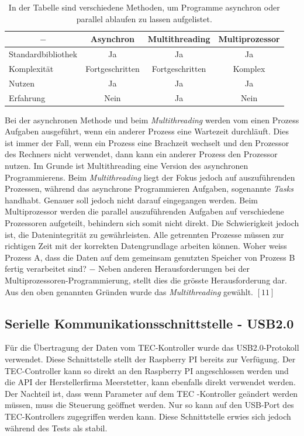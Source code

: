 \begin{table}[H]
    \centering
    \begin{tabular}{l|c|c|c}
         \multicolumn{1}{c|}{$-$}&   \textbf{Asynchron}& \textbf{Multithreading}& \textbf{Multiprozessor}\\
         \hline
         Standardbibliothek&        Ja&                 Ja&                 Ja\\
         Komplexität&               Fortgeschritten&    Fortgeschritten&    Komplex\\
         Nutzen&                    Ja&                 Ja&                 Ja\\
         Erfahrung&                 Nein&               Ja&                 Nein
    \end{tabular}
    \caption{In der Tabelle sind verschiedene Methoden, um Programme asynchron oder parallel ablaufen zu lassen aufgelistet.}
    \label{tab:async_threading_multiprocessor}
\end{table}

Bei der asynchronen Methode und beim \textit{Multithreading} werden vom einen Prozess Aufgaben ausgeführt, wenn ein anderer Prozess eine Wartezeit durchläuft. Dies ist immer der Fall, wenn ein Prozess eine Brachzeit wechselt und  den Prozessor des Rechners nicht verwendet, dann kann ein anderer Prozess den Prozessor nutzen. Im Grunde ist Multithreading eine Version des asynchronen Programmierens. Beim \textit{Multithreading} liegt der Fokus jedoch auf auszuführenden Prozessen, während das asynchrone Programmieren Aufgaben, sogenannte \textit{Tasks} handhabt. Genauer soll jedoch nicht darauf eingegangen werden. Beim Multiprozessor werden die parallel auszuführenden Aufgaben auf verschiedene Prozessoren aufgeteilt, behindern sich somit nicht direkt. Die Schwierigkeit jedoch ist, die Datenintegrität zu gewährleisten. Alle getrennten Prozesse müssen zur richtigen Zeit mit der korrekten Datengrundlage arbeiten können. Woher weiss Prozess A, dass die Daten auf dem gemeinsam genutzten Speicher von Prozess B fertig verarbeitet sind? $-$ Neben anderen Herausforderungen bei der Multiprozessoren-Programmierung, stellt dies die grösste Herausforderung dar. Aus den oben genannten Gründen wurde das \textit{Multithreading} gewählt. $[11]$


\subsection{Serielle Kommunikationsschnittstelle - USB2.0}
Für die Übertragung der Daten vom TEC-Kontroller wurde das USB2.0-Protokoll verwendet. Diese Schnittstelle stellt der Raspberry PI bereits zur Verfügung. Der TEC-Controller kann so direkt an den Raspberry PI angeschlossen werden und die API der Herstellerfirma Meerstetter, kann ebenfalls direkt verwendet werden. Der Nachteil ist, dass wenn Parameter auf dem TEC -Kontroller geändert werden müssen, muss die Steuerung geöffnet werden. Nur so kann auf den USB-Port des TEC-Kontrollers zugegriffen werden kann. Diese Schnittstelle erwies sich jedoch während des Tests als stabil.

\nocite{*}